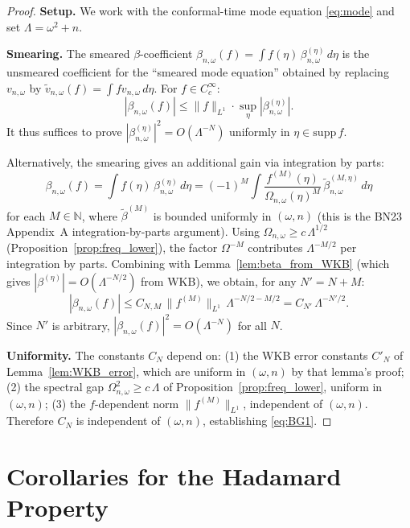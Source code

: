 \documentclass[11pt, a4paper]{article}
\newcommand{\NN}{\mathbb{N}}
\newcommand{\om}{\omega}
\newcommand{\Lam}{\Lambda}
\begin{document}
\begin{proof}
  \textbf{Setup.}
  We work with the conformal-time mode equation \eqref{eq:mode} and
  set $\Lam = \om^2 + n$.

  \textbf{Smearing.}
  The smeared $\beta$-coefficient $\beta_{n,\om}(f) = \int f(\eta)\,\beta_{n,\om}^{(\eta)}\,d\eta$
  is the unsmeared coefficient for the ``smeared mode equation''
  obtained by replacing $v_{n,\om}$ by $\tilde{v}_{n,\om}(f) = \int f v_{n,\om}\,d\eta$.
  For $f \in C_c^\infty$:
  \begin{equation}
    |\beta_{n,\om}(f)| \leq \|f\|_{L^1} \cdot \sup_\eta |\beta_{n,\om}^{(\eta)}|.
  \end{equation}
  It thus suffices to prove $|\beta_{n,\om}^{(\eta)}|^2 = O(\Lam^{-N})$
  uniformly in $\eta \in \mathrm{supp}\,f$.

  Alternatively, the smearing gives an additional gain via integration by parts:
  \begin{equation}\label{eq:IBP}
    \beta_{n,\om}(f) = \int f(\eta)\,\beta_{n,\om}^{(\eta)}\,d\eta
    = (-1)^M \int \frac{f^{(M)}(\eta)}{\Omega_{n,\om}(\eta)^M}\,
    \tilde\beta_{n,\om}^{(M,\eta)}\,d\eta
  \end{equation}
  for each $M \in \NN$, where $\tilde\beta^{(M)}$ is bounded uniformly
  in $(\om, n)$ (this is the BN23 Appendix~A integration-by-parts argument).
  Using $\Omega_{n,\om} \geq c\,\Lam^{1/2}$ (Proposition~\ref{prop:freq_lower}),
  the factor $\Omega^{-M}$ contributes $\Lam^{-M/2}$ per integration by parts.
  Combining with Lemma~\ref{lem:beta_from_WKB}
  (which gives $|\beta^{(\eta)}| = O(\Lam^{-N/2})$ from WKB),
  we obtain, for any $N' = N + M$:
  \begin{equation}
    |\beta_{n,\om}(f)|
    \leq C_{N,M}\,\|f^{(M)}\|_{L^1}\,\Lam^{-N/2 - M/2}
    = C_{N'}\,\Lam^{-N'/2}.
  \end{equation}
  Since $N'$ is arbitrary, $|\beta_{n,\om}(f)|^2 = O(\Lam^{-N})$ for all $N$.

  \textbf{Uniformity.}
  The constants $C_N$ depend on:
  (1) the WKB error constants $C'_N$ of Lemma~\ref{lem:WKB_error},
  which are uniform in $(\om, n)$ by that lemma's proof;
  (2) the spectral gap $\Omega_{n,\om}^2 \geq c\,\Lam$ of
  Proposition~\ref{prop:freq_lower}, uniform in $(\om, n)$;
  (3) the $f$-dependent norm $\|f^{(M)}\|_{L^1}$, independent of $(\om, n)$.
  Therefore $C_N$ is independent of $(\om, n)$, establishing \eqref{eq:BG1}.
\end{proof}

\section{Corollaries for the Hadamard Property}
\end{document}
